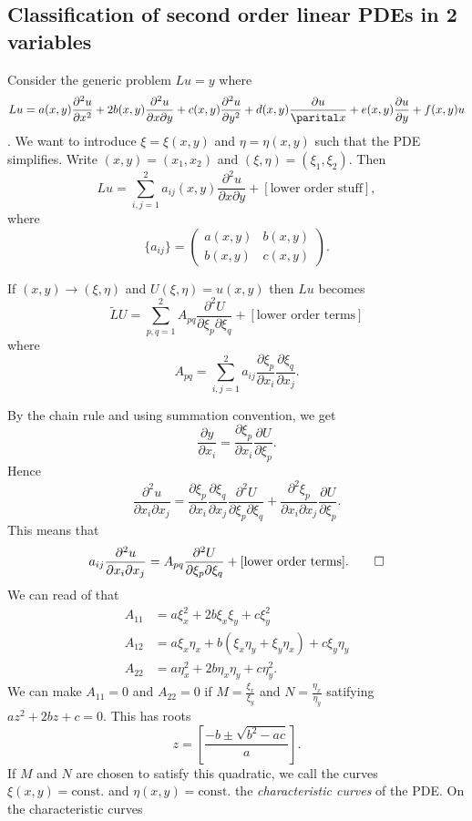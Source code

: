 \documentclass{article}
\begin{document}
\subsection{Classification of second order linear PDEs in 2 variables}
Consider the generic problem $ Lu=y $ where
\[Lu=a(x,y)\frac{\partial^2 u}{\partial x^2}+2b(x,y)\frac{\partial^2 u}{\partial x\partial y}+c(x,y)\frac{\partial^2u}{\partial y^2}+d(x,y)\frac{\partial u}{\parital x}+e(x,y)\frac{\partial u}{\partial y}+f(x,y)u \].
We want to introduce $ \xi=\xi(x,y) $ and $ \eta=\eta(x,y) $ such that the PDE simplifies. Write $ (x,y)=(x_1,x_2) $ and $ (\xi,\eta)=(\xi_1,\xi_2) $. Then
\[
	Lu=\sum_{i,j=1}^2a_{ij}(x,y)\frac{\partial^2u}{\partial x\partial y}+[\text{lower order stuff}],
\]
where
\[
	\{a_{ij}\}=\begin{pmatrix}
		a(x,y) & b(x,y) \\
		b(x,y) & c(x,y)
	\end{pmatrix}.
\]
\begin{proposition}
  If $ (x,y)\to (\xi,\eta) $ and $ U(\xi,\eta)=u(x,y) $ then $ Lu $ becomes
  \[
	  \tilde LU=\sum_{p,q=1}^2 A_{pq}\frac{\partial^2 U}{\partial \xi_p\partial \xi_q}+[\text{lower order terms}]
  \]
  where 
  \[
	  A_{pq}=\sum_{i,j=1}^2a_{ij}\frac{\partial \xi_p}{\partial x_i}\frac{\partial \xi_q}{\partial x_j}.
  \]
\end{proposition}
\pf By the chain rule and using summation convention, we get
\[
	\frac{\partial y}{\partial x_i}=\frac{\partial \xi_p}{\partial x_i}\frac{\partial U}{\partial \xi_p}.
\]
Hence
\[
	\frac{\partial^2 u}{\partial x_i\partial x_j}=\frac{\partial \xi_p}{\partial x_i}\frac{\partial \xi_q}{\partial x_j}\frac{\partial^2 U}{\partial \xi_p\partial \xi_q} + \frac{\partial^2 \xi_p}{\partial x_i\partial x_j}\frac{\partial U}{\partial \xi_p}.
\]
This means that
\[
	a_{ij}\frac{\partial^2u}{\partial x_i\partial x_j}=A_{pq}\frac{\partial^2U}{\partial \xi_p\partial \xi_q}+[\text{lower order terms}].\qed
\]
We can read of that
\begin{align*}
	A_{11}&=a\xi_x^2+2b\xi_x\xi_y+c\xi_y^2\\
	A_{12}&=a\xi_x\eta_x+b(\xi_x\eta_y+\xi_y\eta_x)+c\xi_y\eta_y\\
	A_{22}&=a\eta^2_x+2b\eta_x\eta_y+c\eta^2_y. 
\end{align*}
We can make $ A_{11}=0 $ and $ A_{22}=0 $ if $ M=\frac{\xi_x}{\xi_y} $ and $ N=\frac{\eta_x}{\eta_y} $ satifying $ az^2+2bz+c=0 $. This has roots
\[
	z=\left[\frac{-b\pm \sqrt{b^2-ac}}a\right].
\]
If $ M $ and $ N $ are chosen to satisfy this quadratic, we call the curves $ \xi(x,y)=\text{const.} $ and $ \eta(x,y)=\text{const.} $ the \textit{characteristic curves} of the PDE. On the characteristic curves
\end{document}
